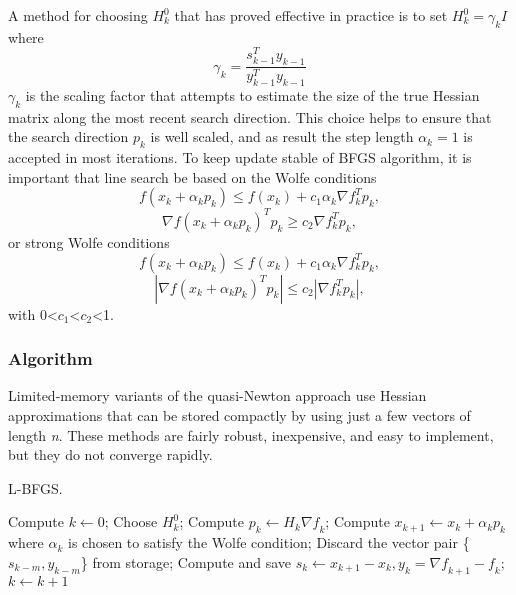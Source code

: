 A method for choosing $H^0_{k}$ that has proved effective in practice is to set $H^0_{k}=\gamma_{k}I$  where 
\begin{equation}
\gamma_{k}= \frac{s^T_{k-1}y_{k-1}}{y^T_{k-1}y_{k-1}}
\end{equation}
$\gamma_{k}$ is the scaling factor that attempts to estimate the size of the true Hessian matrix along the most recent search direction. This choice helps to ensure that the search direction $p_{k}$ is well scaled, and as result the step length $\alpha_{k}=1$ is accepted in most iterations. To keep update stable of BFGS algorithm, it is important that line search be based on the Wolfe conditions
\begin{equation}
f(x_k + \alpha_kp_k ) \leq f (x_k ) + c_1 \alpha_k \nabla f_k^T p_k,
\end{equation}
\begin{equation}
\nabla f(x_k + \alpha_{k} p_k )^T p_k \geq c_2 \nabla f_k^T p_k ,
\end{equation}
or strong Wolfe conditions
\begin{equation}
f(x_k + \alpha_kp_k ) \leq f (x_k ) + c_1 \alpha_k \nabla f_k^T p_k,
\end{equation}
\begin{equation}
|\nabla f(x_k + \alpha_{k} p_k )^T p_k| \leq c_2 |\nabla f_k^T p_k| ,
\end{equation}
with 0<$c_1$<$c_2$<1.

\subsubsection{Algorithm}
Limited-memory variants  of  the  quasi-Newton  approach use  Hessian  approximations  that  can  be stored compactly by using just a few vectors of length \textit{n}. These methods are fairly robust, inexpensive, and easy to implement, but they do not converge rapidly.

\begin{algorithm}[H]
	\caption{L-BFGS.}
	\label{alg:LBFGS}
	\begin{algorithmic}[4]
		\State Compute $k \gets 0$;
		\Repeat
		\State Choose \textbf{$H^0_k$};
		\State Compute $p_k \gets H_k\nabla \textit{f}_k$;
		\State Compute $x_{k+1} \gets x_{k}+ \alpha_{k}p_{k}$ where $\alpha_{k}$ is chosen to satisfy the Wolfe condition;
		\State Discard the vector pair \{$s_{k-m},y_{k-m}$\} from storage;
		\EndIf
		\State Compute and save $s_k \gets x_{k+1}-x_{k}, y_k=\nabla \textit{f}_{k+1}-\textit{f}_k$;
		\State $k \gets k+1$
		\EndProcedure 
	\end{algorithmic}
\end{algorithm}

